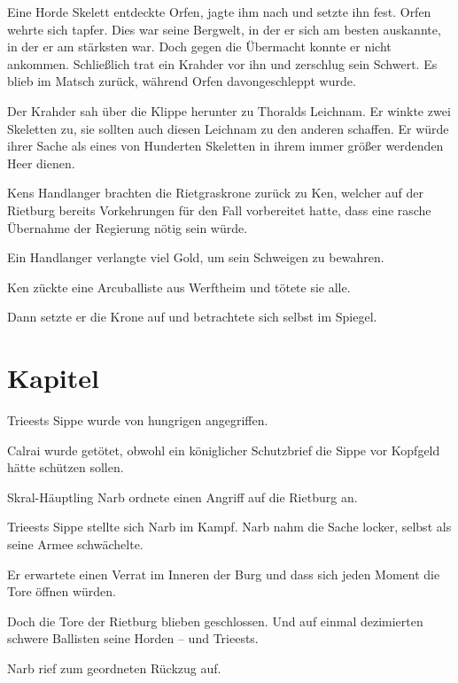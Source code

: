 Eine Horde Skelett entdeckte Orfen, jagte ihm nach und setzte ihn fest. Orfen wehrte sich tapfer. Dies war seine Bergwelt, in der er sich am besten auskannte, in der er am stärksten war. Doch gegen die Übermacht konnte er nicht ankommen. Schließlich trat ein Krahder vor ihn und zerschlug sein Schwert. Es blieb im Matsch zurück, während Orfen davongeschleppt wurde.

Der Krahder sah über die Klippe herunter zu Thoralds Leichnam. Er winkte zwei Skeletten zu, sie sollten auch diesen Leichnam zu den anderen schaffen. Er würde ihrer Sache als eines von Hunderten Skeletten in ihrem immer größer werdenden Heer dienen.

\trennzeichen

Kens Handlanger brachten die Rietgraskrone zurück zu Ken, welcher auf der Rietburg bereits Vorkehrungen für den Fall vorbereitet hatte, dass eine rasche Übernahme der Regierung nötig sein würde.

Ein Handlanger verlangte viel Gold, um sein Schweigen zu bewahren.

Ken zückte eine Arcuballiste aus Werftheim und tötete sie alle.

Dann setzte er die Krone auf und betrachtete sich selbst im Spiegel.




\newpage
\section{Kapitel}

Trieests Sippe wurde von hungrigen  angegriffen.

Calrai wurde getötet, obwohl ein königlicher Schutzbrief die Sippe vor Kopfgeld hätte schützen sollen.

\trennzeichen

Skral-Häuptling Narb ordnete einen Angriff auf die Rietburg an. 

Trieests Sippe stellte sich Narb im Kampf. Narb nahm die Sache locker, selbst als seine Armee schwächelte.

Er erwartete einen Verrat im Inneren der Burg und dass sich jeden Moment die Tore öffnen würden.

Doch die Tore der Rietburg blieben geschlossen. Und auf einmal dezimierten schwere Ballisten seine Horden – und Trieests.

Narb rief zum geordneten Rückzug auf.

\trennzeichen

